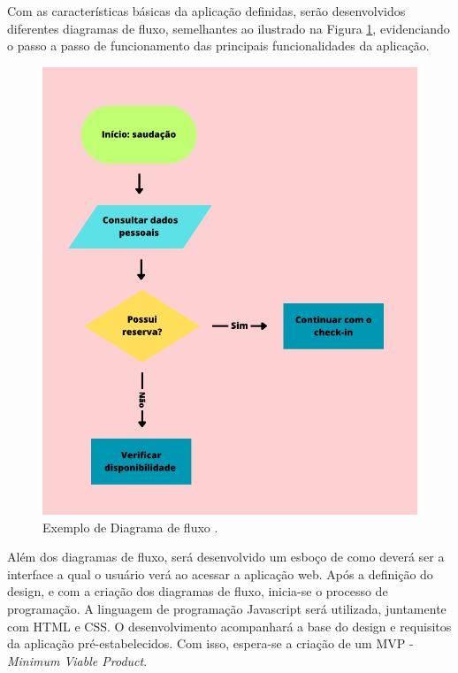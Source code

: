 \documentclass[
	12pt,				%
	openright,			%
	oneside,			%
	a4paper,			%
	english,			%
	brazil				%
	]{abntex2}
\theoremstyle{doispontos}
\begin{document}
Com as características básicas da aplicação definidas, serão desenvolvidos diferentes diagramas de fluxo, semelhantes ao ilustrado na Figura \ref{fig:diagrama_fluxo}, evidenciando o passo a passo de funcionamento das principais funcionalidades da aplicação. 

\begin{figure}[ht] 
	\centering
	\includegraphics[scale=0.4]{exemplo_diagrama_de_fluxo.png}
	\caption[Exemplo de diagrama de fluxo]{Exemplo de Diagrama de fluxo \textcite{ebac_diagrama_fluxo}.}
	\label{fig:diagrama_fluxo}
\end{figure}

Além dos diagramas de fluxo, será desenvolvido um esboço de como deverá ser a interface a qual o usuário verá ao acessar a aplicação web. Após a definição do design, e com a criação dos diagramas de fluxo, inicia-se o processo de programação. A linguagem de programação Javascript será utilizada, juntamente com HTML e CSS. O desenvolvimento acompanhará a base do design e requisitos da aplicação pré-estabelecidos. Com isso, espera-se a criação de um MVP - \textit{Minimum Viable Product}.
\end{document}
